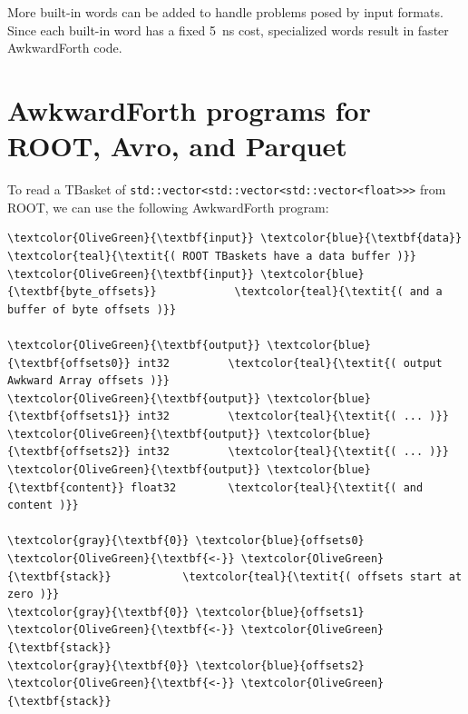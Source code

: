 \documentclass{webofc}
\begin{document}
More built-in words can be added to handle problems posed by input formats. Since each built-in word has a fixed 5~ns cost, specialized words result in faster AwkwardForth code.

\section{AwkwardForth programs for ROOT, Avro, and Parquet}
\label{sec:programs}

To read a TBasket of \texttt{std::vector<std::vector<std::vector<float>>>} from ROOT, we can use the following AwkwardForth program:

\begin{Verbatim}[commandchars=\\\{\}]
\textcolor{OliveGreen}{\textbf{input}} \textcolor{blue}{\textbf{data}}                    \textcolor{teal}{\textit{( ROOT TBaskets have a data buffer )}}
\textcolor{OliveGreen}{\textbf{input}} \textcolor{blue}{\textbf{byte_offsets}}            \textcolor{teal}{\textit{( and a buffer of byte offsets )}}

\textcolor{OliveGreen}{\textbf{output}} \textcolor{blue}{\textbf{offsets0}} int32         \textcolor{teal}{\textit{( output Awkward Array offsets )}}
\textcolor{OliveGreen}{\textbf{output}} \textcolor{blue}{\textbf{offsets1}} int32         \textcolor{teal}{\textit{( ... )}}
\textcolor{OliveGreen}{\textbf{output}} \textcolor{blue}{\textbf{offsets2}} int32         \textcolor{teal}{\textit{( ... )}}
\textcolor{OliveGreen}{\textbf{output}} \textcolor{blue}{\textbf{content}} float32        \textcolor{teal}{\textit{( and content )}}

\textcolor{gray}{\textbf{0}} \textcolor{blue}{offsets0} \textcolor{OliveGreen}{\textbf{<-}} \textcolor{OliveGreen}{\textbf{stack}}           \textcolor{teal}{\textit{( offsets start at zero )}}
\textcolor{gray}{\textbf{0}} \textcolor{blue}{offsets1} \textcolor{OliveGreen}{\textbf{<-}} \textcolor{OliveGreen}{\textbf{stack}}
\textcolor{gray}{\textbf{0}} \textcolor{blue}{offsets2} \textcolor{OliveGreen}{\textbf{<-}} \textcolor{OliveGreen}{\textbf{stack}}


\end{Verbatim}
\end{document}
